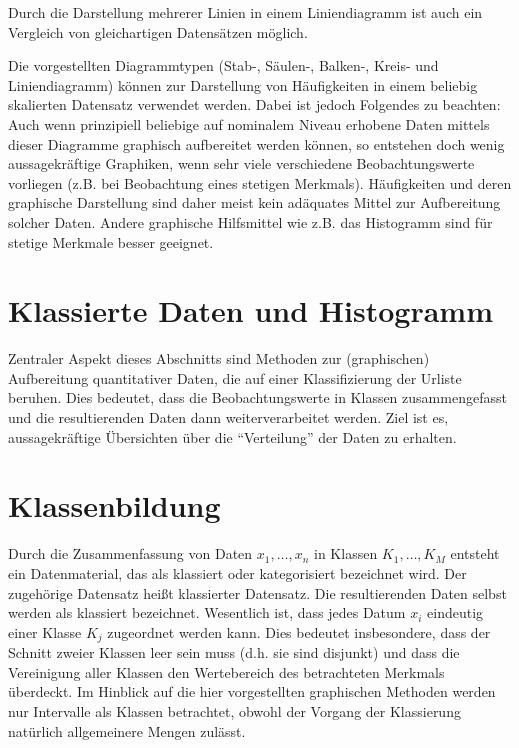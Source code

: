 \documentclass{lecture}
\begin{document}
    Durch die Darstellung mehrerer Linien in einem Liniendiagramm ist auch ein Vergleich von gleichartigen Datensätzen möglich.

    Die vorgestellten Diagrammtypen (Stab-, Säulen-, Balken-, Kreis- und Liniendiagramm) können zur Darstellung von Häufigkeiten in einem beliebig skalierten Datensatz verwendet werden.
    Dabei ist jedoch Folgendes zu beachten: Auch wenn prinzipiell beliebige auf nominalem Niveau erhobene Daten mittels dieser Diagramme graphisch aufbereitet werden können, so entstehen doch wenig aussagekräftige Graphiken, wenn sehr viele verschiedene Beobachtungswerte vorliegen (z.B. bei Beobachtung eines stetigen Merkmals).
    Häufigkeiten und deren graphische Darstellung sind daher meist kein adäquates Mittel zur Aufbereitung solcher Daten.
    Andere graphische Hilfsmittel wie z.B. das Histogramm sind für stetige Merkmale besser geeignet.


    \section*{Klassierte Daten und Histogramm}

    Zentraler Aspekt dieses Abschnitts sind Methoden zur (graphischen) Aufbereitung quantitativer Daten, die auf einer Klassifizierung der Urliste beruhen.
    Dies bedeutet, dass die Beobachtungswerte in Klassen zusammengefasst und die resultierenden Daten dann weiterverarbeitet werden.
    Ziel ist es, aussagekräftige Übersichten über die ``Verteilung'' der Daten zu erhalten.


    \section*{Klassenbildung}

    Durch die Zusammenfassung von Daten \(x_1, \ldots, x_n\) in Klassen \(K_1, \ldots, K_M\) entsteht ein Datenmaterial, das als klassiert oder kategorisiert bezeichnet wird.
    Der zugehörige Datensatz heißt klassierter Datensatz.
    Die resultierenden Daten selbst werden als klassiert bezeichnet.
    Wesentlich ist, dass jedes Datum \(x_i\) eindeutig einer Klasse \(K_j\) zugeordnet werden kann.
    Dies bedeutet insbesondere, dass der Schnitt zweier Klassen leer sein muss (d.h. sie sind disjunkt) und dass die Vereinigung aller Klassen den Wertebereich des betrachteten Merkmals überdeckt.
    Im Hinblick auf die hier vorgestellten graphischen Methoden werden nur Intervalle als Klassen betrachtet, obwohl der Vorgang der Klassierung natürlich allgemeinere Mengen zulässt.
\end{document}
